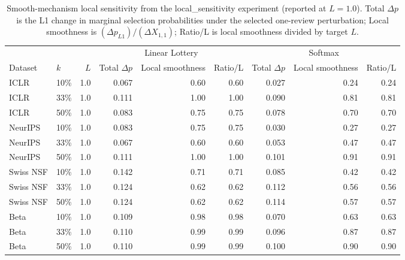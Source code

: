 \begin{table}[t]
\centering
\small
\setlength{\tabcolsep}{4pt}
\begin{tabular}{llr|rrr|rrr}
\toprule
 & & & \multicolumn{3}{c}{Linear Lottery} & \multicolumn{3}{c}{Softmax} \\
Dataset & $k$ & $L$ & Total $\Delta p$ & Local smoothness & Ratio/L & Total $\Delta p$ & Local smoothness & Ratio/L \\
\midrule
ICLR & 10\% & 1.0 & 0.067 & 0.60 & 0.60 & 0.027 & 0.24 & 0.24 \\
ICLR & 33\% & 1.0 & 0.111 & 1.00 & 1.00 & 0.090 & 0.81 & 0.81 \\
ICLR & 50\% & 1.0 & 0.083 & 0.75 & 0.75 & 0.078 & 0.70 & 0.70 \\
\midrule
NeurIPS & 10\% & 1.0 & 0.083 & 0.75 & 0.75 & 0.030 & 0.27 & 0.27 \\
NeurIPS & 33\% & 1.0 & 0.067 & 0.60 & 0.60 & 0.053 & 0.47 & 0.47 \\
NeurIPS & 50\% & 1.0 & 0.111 & 1.00 & 1.00 & 0.101 & 0.91 & 0.91 \\
\midrule
Swiss NSF & 10\% & 1.0 & 0.142 & 0.71 & 0.71 & 0.085 & 0.42 & 0.42 \\
Swiss NSF & 33\% & 1.0 & 0.124 & 0.62 & 0.62 & 0.112 & 0.56 & 0.56 \\
Swiss NSF & 50\% & 1.0 & 0.124 & 0.62 & 0.62 & 0.114 & 0.57 & 0.57 \\
\midrule
Beta & 10\% & 1.0 & 0.109 & 0.98 & 0.98 & 0.070 & 0.63 & 0.63 \\
Beta & 33\% & 1.0 & 0.110 & 0.99 & 0.99 & 0.096 & 0.87 & 0.87 \\
Beta & 50\% & 1.0 & 0.110 & 0.99 & 0.99 & 0.100 & 0.90 & 0.90 \\
\bottomrule
\end{tabular}
\caption{Smooth-mechanism local sensitivity from the local_sensitivity experiment (reported at $L=1.0$). Total $\Delta p$ is the L1 change in marginal selection probabilities under the selected one-review perturbation; Local smoothness is $(\Delta p_{L1})/(\Delta X_{1,1})$; Ratio/L is local smoothness divided by target $L$.}
\label{tab:baseline_local_sensitivity_smooth}
\end{table}
